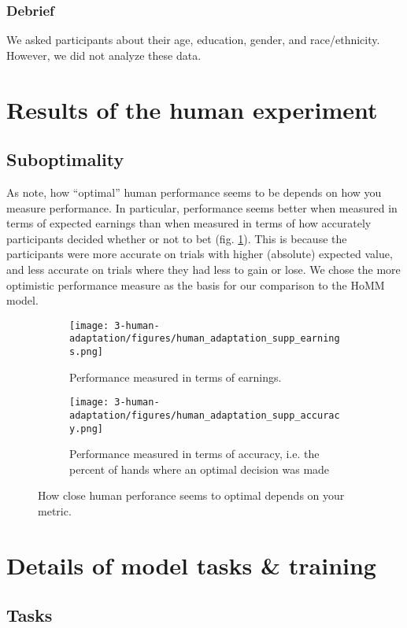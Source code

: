 \subsubsection{Debrief}
We asked participants about their age, education, gender, and race/ethnicity. However, we did not analyze these data.


\section{Results of the human experiment}
\subsection{Suboptimality}\label{appendix:human:suboptimality}
As \citet{Jarvstad2013} note, how ``optimal'' human performance seems to be depends on how you measure performance. In particular, performance seems better when measured in terms of expected earnings than when measured in terms of how accurately participants decided whether or not to bet (fig. \ref{fig:appx_human_calibration}). This is because the participants were more accurate on trials with higher (absolute) expected value, and less accurate on trials where they had less to gain or lose. We chose the more optimistic performance measure as the basis for our comparison to the HoMM model.
\begin{figure}[H]
\centering
\begin{subfigure}[t]{0.5\textwidth}
\texttt{[image: 3-human-adaptation/figures/human\_adaptation\_supp\_earnings.png]}
\caption{Performance measured in terms of earnings.}
\end{subfigure}%
\begin{subfigure}[t]{0.5\textwidth}
\texttt{[image: 3-human-adaptation/figures/human\_adaptation\_supp\_accuracy.png]}
\caption{Performance measured in terms of accuracy, i.e. the percent of hands where an optimal decision was made}
\end{subfigure}%
\caption{How close human perforance seems to optimal depends on your metric.} \label{fig:appx_human_calibration}
\end{figure}


\section{Details of model tasks \& training}\label{app:human:model_details}
\subsection{Tasks}

